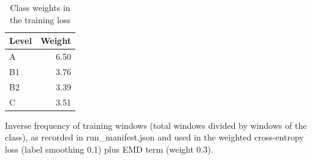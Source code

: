 \begin{table}[htbp]
\centering
\begin{threeparttable}
\caption{Class weights in the training loss}
\label{tab:clf-weights}
\begin{tabular}{lr}
\hline
Level & Weight \\
\hline
A & 6.50 \\
B1 & 3.76 \\
B2 & 3.39 \\
C & 3.51 \\
\hline
\end{tabular}
\begin{tablenotes}
\footnotesize
\item Inverse frequency of training windows (total windows divided by windows of the class), as recorded in run\_manifest.json and used in the weighted cross-entropy loss (label smoothing 0.1) plus EMD term (weight 0.3).
\end{tablenotes}
\end{threeparttable}
\end{table}
